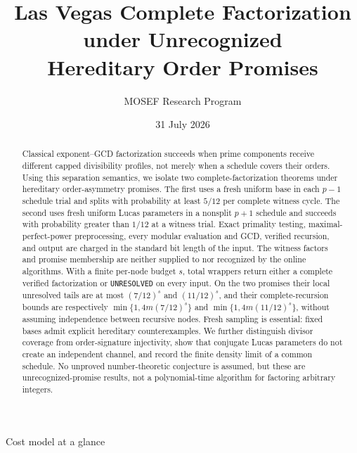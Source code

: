 \documentclass[11pt]{article}
\title{Las Vegas Complete Factorization under Unrecognized\\
Hereditary Order Promises}
\author{MOSEF Research Program}
\date{31 July 2026}
\begin{document}
\maketitle

\begin{abstract}
Classical exponent--GCD factorization succeeds when prime components receive
different capped divisibility profiles, not merely when a schedule covers
their orders.  Using this separation semantics, we isolate two
complete-factorization theorems under hereditary order-asymmetry promises.
The first uses a fresh uniform base in each \(p-1\) schedule trial and splits
with probability at least \(5/12\) per complete witness cycle.  The second
uses fresh uniform Lucas parameters in a nonsplit \(p+1\) schedule and
succeeds with probability greater than \(1/12\) at a witness trial.  Exact
primality testing, maximal-perfect-power preprocessing, every modular
evaluation and GCD, verified recursion, and output are charged in the
standard bit length of the input.  The witness factors and promise
membership are neither supplied to nor recognized by the online algorithms.
With a finite per-node budget \(s\), total wrappers return either a complete
verified factorization or \texttt{UNRESOLVED} on every input.  On the two
promises their local unresolved tails are at most \((7/12)^s\) and
\((11/12)^s\), and their complete-recursion bounds are respectively
\(\min\{1,4m(7/12)^s\}\) and \(\min\{1,4m(11/12)^s\}\), without assuming
independence between recursive nodes.  Fresh sampling is essential: fixed
bases admit explicit hereditary counterexamples.  We further distinguish
divisor coverage from order-signature injectivity, show that conjugate Lucas
parameters do not create an independent channel, and record the finite
density limit of a common schedule.  No unproved number-theoretic conjecture
is assumed, but these are unrecognized-promise results, not a polynomial-time
algorithm for factoring arbitrary integers.
\end{abstract}

\begin{costmodel}{Cost model at a glance}
\end{costmodel}
\end{document}
